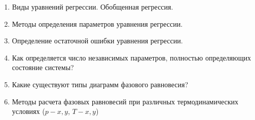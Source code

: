 \begin{enumerate}
	\item Виды уравнений регрессии. Обобщенная регрессия.
	\item Методы определения параметров уравнения регрессии.
	\item Определение остаточной ошибки уравнения регрессии.
	\item Как определяется число независимых параметров, полностью определяющих состояние системы?
	\item Какие существуют типы диаграмм фазового равновесия?
	\item Методы расчета фазовых равновесий при различных термодинамических условиях ($p-x,y$,  $T-x,y$)
\end{enumerate}